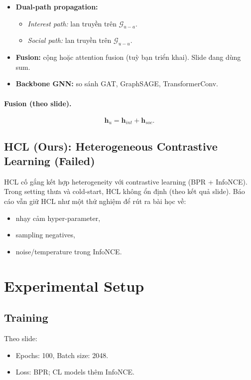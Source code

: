 \documentclass[11pt]{article}
\begin{document}
\begin{itemize}
  \item \textbf{Dual-path propagation:}
  \begin{itemize}
    \item \emph{Interest path:} lan truyền trên $\mathcal{G}_{u-a}$.
    \item \emph{Social path:} lan truyền trên $\mathcal{G}_{u-u}$.
  \end{itemize}
  \item \textbf{Fusion:} cộng hoặc attention fusion (tuỳ bạn triển khai). Slide đang dùng sum.
  \item \textbf{Backbone GNN:} so sánh GAT, GraphSAGE, TransformerConv.
\end{itemize}

\paragraph{Fusion (theo slide).}
\[
\mathbf{h}_u = \mathbf{h}_{int} + \mathbf{h}_{soc}.
\]

\subsection{HCL (Ours): Heterogeneous Contrastive Learning (Failed)}
HCL cố gắng kết hợp heterogeneity với contrastive learning (BPR + InfoNCE). Trong setting thưa và cold-start, HCL không ổn định (theo kết quả slide). Báo cáo vẫn giữ HCL như một thử nghiệm để rút ra bài học về:
\begin{itemize}
  \item nhạy cảm hyper-parameter,
  \item sampling negatives,
  \item noise/temperature trong InfoNCE.
\end{itemize}

\section{Experimental Setup}
\label{sec:exp}

\subsection{Training}
Theo slide:
\begin{itemize}
  \item Epochs: 100, Batch size: 2048.
  \item Loss: BPR; CL models thêm InfoNCE.
\end{itemize}
\end{document}
